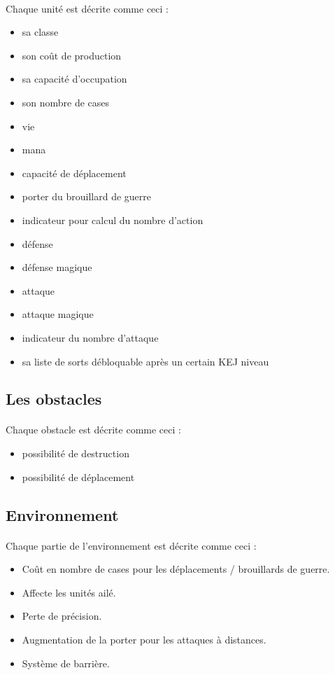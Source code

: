 \paragraph{} Chaque unité est décrite comme ceci :
\begin{itemize}
	\item sa classe
	\item son coût de production
	\item sa capacité d'occupation
	\item son nombre de cases
	\item vie
	\item mana
	\item capacité de déplacement
	\item porter du brouillard de guerre
	\item indicateur pour calcul du nombre d'action
	\item défense
	\item défense magique
	\item attaque
	\item attaque magique
	\item indicateur du nombre d'attaque
	\item sa liste de sorts débloquable après un certain KEJ niveau
\end{itemize}

\subsection{Les obstacles}

\paragraph{} Chaque obstacle est décrite comme ceci :
\begin{itemize}
	\item possibilité de destruction
	\item possibilité de déplacement
\end{itemize}

\subsection{Environnement}

\paragraph{} Chaque partie de l'environnement est décrite comme ceci :
\begin{itemize}
	\item Coût en nombre de cases pour les déplacements / brouillards de guerre.
	\item Affecte les unités ailé.
	\item Perte de précision.
	\item Augmentation de la porter pour les attaques à distances.
	\item Système de barrière.
\end{itemize}

